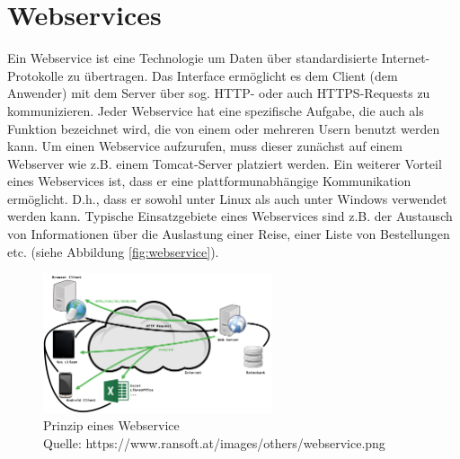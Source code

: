 \section{Webservices}
\label{sec:Webservices}
Ein Webservice ist eine Technologie um Daten über standardisierte Internet-Protokolle zu übertragen.
Das Interface ermöglicht es dem Client (dem Anwender) mit dem Server über sog. \acs{HTTP}- oder auch \acs{HTTPS}-Requests zu kommunizieren.
Jeder Webservice hat eine spezifische Aufgabe, die auch als Funktion bezeichnet wird, die von einem oder mehreren Usern benutzt werden kann.
Um einen Webservice aufzurufen, muss dieser zunächst auf einem Webserver wie z.B. einem Tomcat-Server platziert werden.
Ein weiterer Vorteil eines Webservices ist, dass er eine plattformunabhängige Kommunikation ermöglicht.
D.h., dass er sowohl unter Linux als auch unter Windows verwendet werden kann.
Typische Einsatzgebiete eines Webservices sind z.B. der Austausch von Informationen über die Auslastung einer Reise, einer Liste von Bestellungen etc. (siehe Abbildung \vref{fig:webservice}).

\begin{figure}[h]
	\centering 
	\includegraphics[width=0.6\textwidth]{img/webservice.png}
	\captionsetup{format=hang}
	\caption[Prinzip eines Webservice]{\label{fig:webservice}Prinzip eines Webservice \\Quelle: https://www.ransoft.at/images/others/webservice.png}
\end{figure}